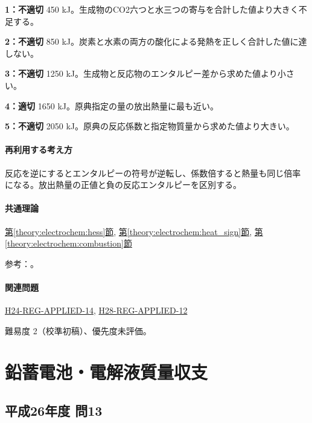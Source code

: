 \noindent\textbf{1：不適切} 450 kJ。生成物のCO2六つと水三つの寄与を合計した値より大きく不足する。\par

\noindent\textbf{2：不適切} 850 kJ。炭素と水素の両方の酸化による発熱を正しく合計した値に達しない。\par

\noindent\textbf{3：不適切} 1250 kJ。生成物と反応物のエンタルピー差から求めた値より小さい。\par

\noindent\textbf{4：適切} 1650 kJ。原典指定の量の放出熱量に最も近い。\par

\noindent\textbf{5：不適切} 2050 kJ。原典の反応係数と指定物質量から求めた値より大きい。\par

\paragraph{再利用する考え方} 反応を逆にするとエンタルピーの符号が逆転し、係数倍すると熱量も同じ倍率になる。放出熱量の正値と負の反応エンタルピーを区別する。

\paragraph{共通理論} \hyperref[theory:electrochem:hess]{第\ref*{theory:electrochem:hess}節}, \hyperref[theory:electrochem:heat_sign]{第\ref*{theory:electrochem:heat_sign}節}, \hyperref[theory:electrochem:combustion]{第\ref*{theory:electrochem:combustion}節}

\par 参考：\cite{openstax_hess}。

\paragraph{関連問題} \hyperref[q:h24-reg-applied-14]{H24-REG-APPLIED-14}, \hyperref[q:h28-reg-applied-12]{H28-REG-APPLIED-12}

\par 難易度 2（校準初稿）、優先度未評価。

\section{鉛蓄電池・電解液質量収支}

\subsection{平成26年度 問13}
\label{q:h26-reg-applied-13}

